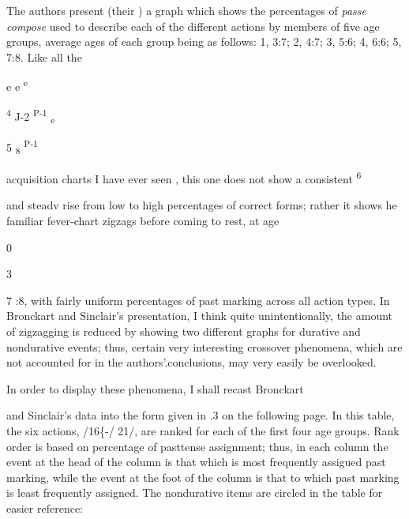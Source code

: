 

The authors present (their ) a graph which shows the percentages of \textit{passe} \textit{compose} used to describe each of the different actions by members of five age groups, average ages of each group being as follows: 1, 3:7; 2, 4:7; 3, 5:6; 4, 6:6; 5, 7:8. Like all the

e e \textsuperscript{e}

\textsuperscript{4 }J-2 \textsuperscript{P-1 }\textsubscript{e} 

5 \textsubscript{8 }\textsuperscript{P-1} 


acquisition charts I have ever seen , this one does not show a consistent\textsuperscript{ 6}

and steadv rise from low to high percentages of correct forms; rather it shows he familiar fever-chart zigzags before coming to rest, at age

0

\begin{table}
\caption{3}
\label{tab:3}
\end{table}

7 :8, with fairly uniform percentages of past marking across all action types. In Bronckart and Sinclair's presentation, I think quite unin\-tentionally, the amount of zigzagging is reduced by showing two different graphs for durative and nondurative events; thus, certain very interesting crossover phenomena, which are not accounted for in the authors'.conclusions, may very easily be overlooked.

In order to display these phenomena, I shall recast Bronckart

and Sinclair's data into the form given in .3 on the following page. In this table, the six actions, /16\{-/ 21/, are ranked for each of the first four age groups. Rank order is based on percentage of past\-tense assignment; thus, in each column the event at the head of the column is that which is most frequently assigued past marking, while the event at the foot of the column is that to which past marking is least frequently assigned. The nondurative items are circled in the
table for easier reference:


